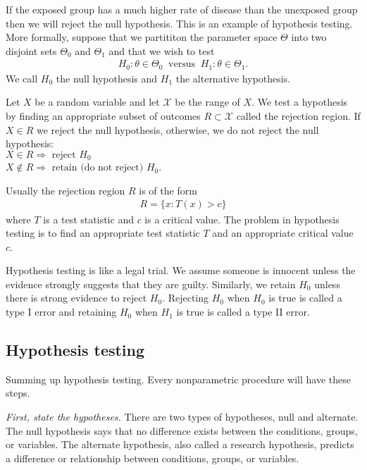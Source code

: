 If the exposed group has a much higher rate of disease than the unexposed group then we will reject the null hypothesis. This is an example of hypothesis testing. More formally, suppose that we partititon the parameter space $\Theta$ into two disjoint sets $\Theta_0$ and $\Theta_1$ and that we wish to test
\begin{align}
    H_0: \theta \in \Theta_0\ \text{ versus }\ H_1: \theta \in \Theta_1.
\end{align}
We call $H_0$ the null hypothesis and $H_1$ the alternative hypothesis.

Let $X$ be a random variable and let $\mathscr{X}$ be the range of $X$. We test a hypothesis by finding an appropriate subset of outcomes $R \subset \mathscr{X}$ called the rejection region. If $X \in R$ we reject the null hypothesis, otherwise, we do not reject the null hypothesis: \\
$X \in R \Rightarrow \text{ reject } H_0$ \\
$X \notin R \Rightarrow \text{ retain (do not reject) } H_0$.

Usually the rejection region $R$ is of the form
\begin{align}
    R = \{x: T(x) > c\}
\end{align}
where $T$ is a test statistic and $c$ is a critical value. The problem in hypothesis testing is to find an appropriate test statistic $T$ and an appropriate critical value $c$.

Hypothesis testing is like a legal trial. We assume someone is innocent unless the evidence strongly suggests that they are guilty. Similarly, we retain $H_0$ unless there is strong evidence to reject $H_0$. Rejecting $H_0$ when $H_0$ is true is called a type I error and retaining $H_0$ when $H_1$ is true is called a type II error.

\subsection{Hypothesis testing}

Summing up hypothesis testing. Every nonparametric procedure will have these steps.

\textit{First, state the hypotheses.} There are two types of hypotheses, null and alternate. The null hypothesis says that no difference exists between the conditions, groups, or variables. The alternate hypothesis, also called a research hypothesis, predicts a difference or relationship between conditions, groups, or variables.

